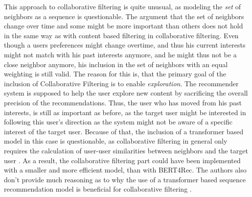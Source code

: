 \documentclass{Academic}
\begin{document}
        This approach to collaborative filtering is quite unusual, as modeling the \textit{set} of neighbors as a sequence is questionable. The argument that the set of neighbors change over time and some might be more important than others does not hold in the same way as with content based filtering in collaborative filtering. Even though a users preferences might change overtime, and thus his current interests might not match with his past interests anymore, and he might thus not be a close neighbor anymore, his inclusion in the set of neighbors with an equal weighting is still valid. The reason for this is, that the primary goal of the inclusion of Collaborative Filtering is to enable \textit{exploration}. The recommender system is supposed to help the user explore new content by sacrificing the overall precision of the recommendations. Thus, the user who has moved from his past interests, is still as important as before, as the target user might be interested in following this user's direction as the system might not be aware of a specific interest of the target user. Because of that, the inclusion of a transformer based model in this case is questionable, as collaborative filtering in general only requires the calculation of user-user similarities between neighbors and the target user \cite{channarongHybridBERT4RecHybridContentBased2022}. As a result, the collaborative filtering part could have been implemented with a smaller and more efficient model, than with BERT4Rec. The authors also don't provide much reasoning as to why the use of a transformer based sequence recommendation model is beneficial for collaborative filtering \cite{channarongHybridBERT4RecHybridContentBased2022}.
\end{document}
